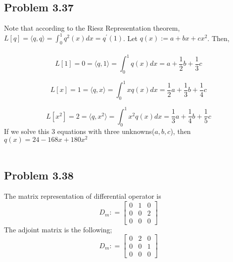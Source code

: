 \documentclass[letterpaper,12pt]{article}
\theoremstyle{definition}
\begin{document}
\begin{spacing}{1.3}{}
	
\subsection*{Problem 3.37}
	Note that according to the Riesz Representation theorem, $L[q] = \langle q,q \rangle = \int_{0}^{1} q^{2}(x)dx = q^{'}(1)$. Let $q(x) := a + bx + c x^2$. Then, \\\\
	\[L[1] = 0 =\langle q,1 \rangle = \int_{0}^{1} q(x)dx = a + \frac{1}{2}b + \frac{1}{3}c \]
	
	\[L[x] = 1 =\langle q,x \rangle = \int_{0}^{1} xq(x)dx = \frac{1}{2}a + \frac{1}{3}b + \frac{1}{4}c \]
	
	\[L[x^2] = 2 =\langle q,x^2 \rangle = \int_{0}^{1} x^2 q(x)dx = \frac{1}{3} a + \frac{1}{4}b + \frac{1}{5}c \]
	If we solve this 3 equations with three unknowns($a,b,c$), then
	$q(x) = 24 - 168x + 180 x^2$ \\\\
	
	\setlength{\leftskip}{10pt}
	
\subsection*{Problem 3.38}
	The matrix representation of differential operator is \\
	\[D_m : = \begin{bmatrix}
	0 & 1 & 0 \\
	0 & 0 & 2 \\
	0 & 0 & 0
	\end{bmatrix}\]
	The adjoint matrix is the following;
	\[D_m : = \begin{bmatrix}
	0 & 2 & 0 \\
	0 & 0 & 1 \\
	0 & 0 & 0
	\end{bmatrix}\]
	\setlength{\leftskip}{10pt}
	

\end{spacing}
\end{document}
